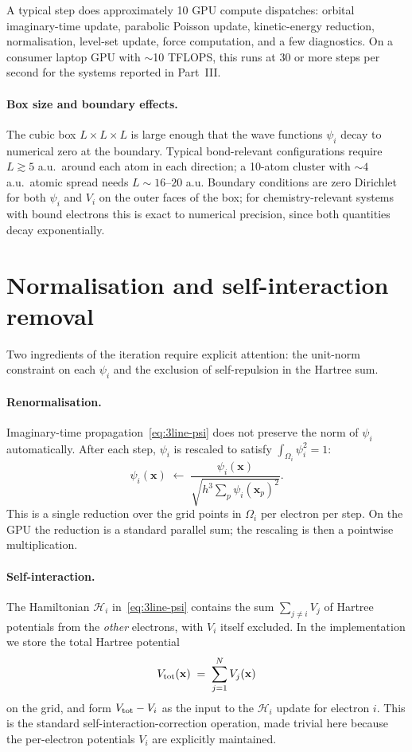 A typical step does approximately 10 GPU compute dispatches: orbital imaginary-time update, parabolic Poisson update, kinetic-energy reduction, normalisation, level-set update, force computation, and a few diagnostics. On a consumer laptop GPU with $\sim$10 TFLOPS, this runs at 30 or more steps per second for the systems reported in Part~III.

\paragraph{Box size and boundary effects.} The cubic box $L \times L \times L$ is large enough that the wave functions $\psi_i$ decay to numerical zero at the boundary. Typical bond-relevant configurations require $L \gtrsim 5$ a.u.\ around each atom in each direction; a 10-atom cluster with $\sim 4$ a.u.\ atomic spread needs $L \sim 16$--$20$ a.u. Boundary conditions are zero Dirichlet for both $\psi_i$ and $V_i$ on the outer faces of the box; for chemistry-relevant systems with bound electrons this is exact to numerical precision, since both quantities decay exponentially.

\section{Normalisation and self-interaction removal}\label{sec:norm-self}

Two ingredients of the iteration require explicit attention: the unit-norm constraint on each $\psi_i$ and the exclusion of self-repulsion in the Hartree sum.

\paragraph{Renormalisation.} Imaginary-time propagation~\eqref{eq:3line-psi} does not preserve the norm of $\psi_i$ automatically. After each step, $\psi_i$ is rescaled to satisfy $\int_{\Omega_i} \psi_i^2 = 1$:
\[
\psi_i(\mathbf{x}) \;\leftarrow\; \frac{\psi_i(\mathbf{x})}{\sqrt{h^3 \sum_p \psi_i(\mathbf{x}_p)^2}}.
\]
This is a single reduction over the grid points in $\Omega_i$ per electron per step. On the GPU the reduction is a standard parallel sum; the rescaling is then a pointwise multiplication.

\paragraph{Self-interaction.} The Hamiltonian $\mathcal{H}_i$ in~\eqref{eq:3line-psi} contains the sum $\sum_{j \ne i} V_j$ of Hartree potentials from the \emph{other} electrons, with $V_i$ itself excluded. In the implementation we store the total Hartree potential
\[
V_{\rm tot}(\mathbf{x}) \;=\; \sum_{j=1}^{N} V_j(\mathbf{x})
\]
on the grid, and form $V_{\rm tot} - V_i$ as the input to the $\mathcal{H}_i$ update for electron $i$. This is the standard self-interaction-correction operation, made trivial here because the per-electron potentials $V_i$ are explicitly maintained.

